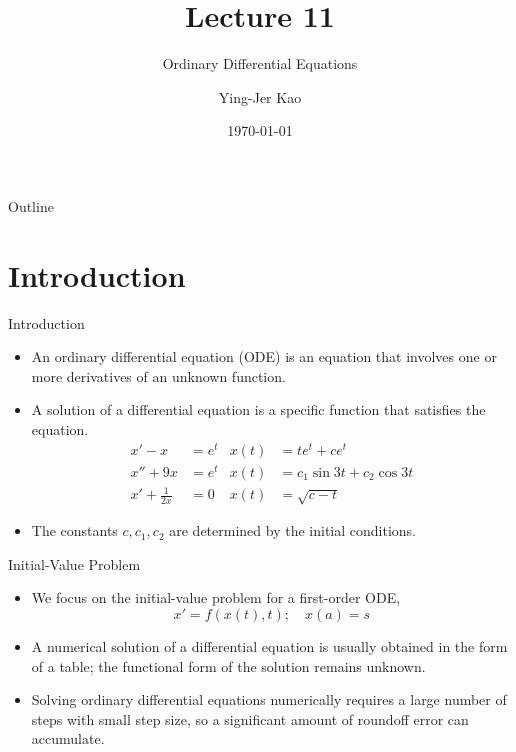 \documentclass{beamer}
\title[Ordinary Differential Equations] %
{Lecture 11}
\subtitle
{Ordinary Differential Equations} %
\author[Ying-Jer Kao] %
{Ying-Jer Kao}
\institute[National Taiwan University] %
{
  Department of Physics\\
 National Taiwan University
  }
\date[Numerical Analysis and Programming] %
{\today}
\newcommand{\beforeverb}{\scriptsize}
\newcommand{\afterverb}{\normalsize}
\begin{document}
\begin{frame}
  \titlepage
\end{frame}

\begin{frame}{Outline}
  \tableofcontents
\end{frame}



\section[Introduction]{Introduction}
\begin{frame}{Introduction}
\begin{itemize}
\item An \alert{ordinary differential equation} (ODE) is an equation that involves one or more derivatives of an unknown function. 
\item A \alert{solution} of a differential equation is a specific function that satisfies the equation.
\begin{align*}
x'-x&=e^t &x(t)&=te^t + c e^t\\
x''+9x&=e^t&x(t)&=c_1\sin3t+c_2 \cos 3t\\
x'+\frac{1}{2x}&=0 &x(t)&=\sqrt{c-t}
\end{align*}
\item The constants $c, c_1, c_2$ are determined by the \alert{initial conditions}. 
 \end{itemize}
\end{frame}

\begin{frame}{Initial-Value Problem}
\begin{itemize}
\item We focus on the initial-value problem for a \alert{first-order} ODE, 
\[
x'=f(x(t),t); \quad x(a)=s
\]
\afterverb 
\item A numerical solution of a differential equation is usually obtained in the form of a \alert{table}; the functional form of the solution remains unknown.
\item Solving ordinary differential equations numerically requires a \alert{large number of steps} with \alert{small step size}, so a significant amount of \alert{roundoff error can accumulate}. 
\end{itemize}
\end{frame}
\end{document}
